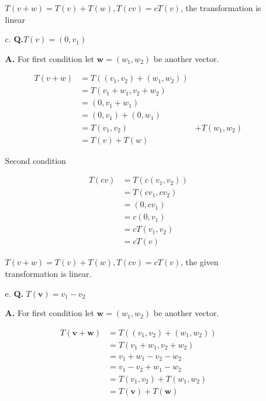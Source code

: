 \documentclass[main.tex]{subfiles}
\begin{document}
\begin{enumerate}
\begin{enumerate}
        $T(v+w)=T(v)+T(w), T(c v)=c T(v)$, the transformation is linear
        
        \item [c.] \textbf{Q.}$T(v)=\left(0, v_{1}\right)$ 
        
        \textbf{A.} For first condition let $\boldsymbol{w}=\left(w_{1}, w_{2}\right)$ be another vector.

        $$
        \begin{aligned}
        T(v+w) &=T\left(\left(v_{1}, v_{2}\right)+\left(w_{1}, w_{2}\right)\right) \\
        &=T\left(v_{1}+w_{1}, v_{2}+w_{2}\right) \\
        &=\left(0, v_{1}+w_{1}\right) \\
        &=\left(0, v_{1}\right)+\left(0, w_{1}\right) \\
        &=T\left(v_{1}, v_{2}\right) &+T\left(w_{1}, w_{2}\right) \\
        &=T(v)+T(w)
        \end{aligned}
        $$
        
        Second condition
        
        $$
        \begin{aligned}
        T(c v) &=T\left(c\left(v_{1}, v_{2}\right)\right) \\
        &=T\left(c v_{1}, c v_{2}\right) \\
        &=\left(0, c v_{1}\right) \\
        &=c\left(0, v_{1}\right) \\
        &=c T\left(v_{1}, v_{2}\right) \\
        &=c T(v)
        \end{aligned}
        $$

        $T(v+w)=T(v)+T(w), T(c v)=c T(v)$, the given transformation is linear.
        
        \item [e.] \textbf{Q.} $T(\boldsymbol{v})=v_{1}-v_{2}$ 
        
        \textbf{A.}  For first condition let $\boldsymbol{w}=\left(w_{1}, w_{2}\right)$ be another vector.

        $$
        \begin{aligned}
        T(\boldsymbol{v}+\boldsymbol{w}) &=T\left(\left(v_{1}, v_{2}\right)+\left(w_{1}, w_{2}\right)\right) \\
        &=T\left(v_{1}+w_{1}, v_{2}+w_{2}\right) \\
        &=v_{1}+w_{1}-v_{2}-w_{2} \\
        &=v_{1}-v_{2}+w_{1}-w_{2} \\
        &=T\left(v_{1}, v_{2}\right)+T\left(w_{1}, w_{2}\right) \\
        &=T(\boldsymbol{v})+T(\boldsymbol{w})
        \end{aligned}
        $$


\end{enumerate}
\end{enumerate}
\end{document}
